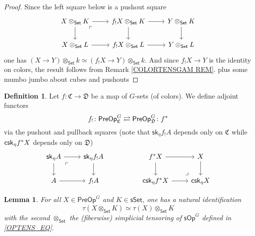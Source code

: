 \documentclass[a4paper,10pt
,draft
]{article}%
\numberwithin{equation}{section}
\numberwithin{figure}{section}
\newtheorem{lemma}[equation]{Lemma}%
\theoremstyle{definition} %
\newtheorem{definition}[equation]{Definition}%
\newcommand{\sSet}{\ensuremath{\mathsf{sSet}}}%
\newcommand{\sOp}{\ensuremath{\mathsf{sOp}}}%
\newcommand{\1}{\ensuremath{\mathbbm 1}}%
\begin{document}
\begin{proof}
Since the left square below is a pushout square
\[
\begin{tikzcd}
	X \otimes_{\mathsf{Set}} K \ar{r} \ar{d} 
	\arrow[dr, phantom, "\ulcorner", very near start]
&
	f_! X \otimes_{\mathsf{Set}} K \ar{r} \ar{d} 
&
	Y \otimes_{\mathsf{Set}} K \ar{d}
\\
	X \otimes_{\mathsf{Set}} L \ar{r} 
&
	f_! X \otimes_{\mathsf{Set}} L \ar{r} 
&
	Y \otimes_{\mathsf{Set}} L
\end{tikzcd}
\]
one has
$(X \to Y) \otimes_{\mathsf{Set}} k \simeq 
(f_!X \to Y) \otimes_{\mathsf{Set}} k$.
And since $f_!X \to Y$ is the identity on colors,
the result follows from Remark \ref{COLORTENSGAM REM}.
	{\color{blue} plus some mumbo jumbo about cubes and pushouts}
\end{proof}



\begin{definition}
	Let $f \colon \mathfrak{C} \to \mathfrak{D}$
	be a map of $G$-sets (of colors).
	We define adjoint functors
	\[
	f_{!} \colon
	\mathsf{PreOp}^{G}_{\mathfrak{C}}
	\rightleftarrows
	\mathsf{PreOp}^{G}_{\mathfrak{D}}
	\colon f^{\**}
	\]
	via the pushout and pullback squares
	(note that $\mathsf{sk}_{\eta} f_! A$ depends only on 
	$\mathfrak{C}$ while 
	$\mathsf{csk}_{\eta} f^{\**} X$ depends only on
	$\mathfrak{D}$)
	\[
	\begin{tikzcd}
	\mathsf{sk}_{\eta} A \ar{r} \ar{d} \arrow[dr, phantom, "\ulcorner", very near start]  &
	\mathsf{sk}_{\eta} f_! A \ar{d}
	&&
	f^{\**} X \ar{r} \ar{d} &
	X \ar{d}
	\\
	A \ar{r} & 
	f_! A
	&&
	\mathsf{csk}_{\eta} f^{\**} X \ar{r} & 
	\mathsf{csk}_{\eta} X
	\arrow[ul, phantom, "\lrcorner", very near start]
	\end{tikzcd}
	\]
\end{definition}





\begin{lemma}\label{TAUOTIMES_LEM}
	For all $X \in \mathsf{PreOp}^G$ and $K \in \sSet$, 
	one has a natural identification
	\[\tau(X \otimes_{\mathsf{Set}} K) \simeq \tau(X) \otimes_{\mathsf{Set}} K\]
	with the second $\otimes_{\mathsf{Set}}$ the (fiberwise) simplicial tensoring of $\sOp^G$ defined in \eqref{OPTENS_EQ}.
\end{lemma}
\end{document}
